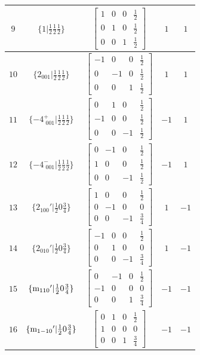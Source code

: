 \documentclass[fleqn,8pt]{jsarticle}
\begin{document}
\begin{longtable}{ccccc}
$ 9 $ & $ \{1|\frac{1}{2} \frac{1}{2} \frac{1}{2}\} $ & $ \begin{bmatrix} 1 & 0 & 0 & \frac{1}{2} \\ 0 & 1 & 0 & \frac{1}{2} \\ 0 & 0 & 1 & \frac{1}{2} \end{bmatrix} $ & $ 1 $ & $ 1 $ \\ \hline
$ 10 $ & $ \{2{}_{001}|\frac{1}{2} \frac{1}{2} \frac{1}{2}\} $ & $ \begin{bmatrix} -1 & 0 & 0 & \frac{1}{2} \\ 0 & -1 & 0 & \frac{1}{2} \\ 0 & 0 & 1 & \frac{1}{2} \end{bmatrix} $ & $ 1 $ & $ 1 $ \\ \hline
$ 11 $ & $ \{-4^{+}_{\,\,001}|\frac{1}{2} \frac{1}{2} \frac{1}{2}\} $ & $ \begin{bmatrix} 0 & 1 & 0 & \frac{1}{2} \\ -1 & 0 & 0 & \frac{1}{2} \\ 0 & 0 & -1 & \frac{1}{2} \end{bmatrix} $ & $ -1 $ & $ 1 $ \\ \hline
$ 12 $ & $ \{-4^{-}_{\,\,001}|\frac{1}{2} \frac{1}{2} \frac{1}{2}\} $ & $ \begin{bmatrix} 0 & -1 & 0 & \frac{1}{2} \\ 1 & 0 & 0 & \frac{1}{2} \\ 0 & 0 & -1 & \frac{1}{2} \end{bmatrix} $ & $ -1 $ & $ 1 $ \\ \hline
$ 13 $ & $ \{2{}_{100}{}'|\frac{1}{2} 0 \frac{3}{4}\} $ & $ \begin{bmatrix} 1 & 0 & 0 & \frac{1}{2} \\ 0 & -1 & 0 & 0 \\ 0 & 0 & -1 & \frac{3}{4} \end{bmatrix} $ & $ 1 $ & $ -1 $ \\ \hline
$ 14 $ & $ \{2{}_{010}{}'|\frac{1}{2} 0 \frac{3}{4}\} $ & $ \begin{bmatrix} -1 & 0 & 0 & \frac{1}{2} \\ 0 & 1 & 0 & 0 \\ 0 & 0 & -1 & \frac{3}{4} \end{bmatrix} $ & $ 1 $ & $ -1 $ \\ \hline
$ 15 $ & $ \{{\rm m}_{110}{}'|\frac{1}{2} 0 \frac{3}{4}\} $ & $ \begin{bmatrix} 0 & -1 & 0 & \frac{1}{2} \\ -1 & 0 & 0 & 0 \\ 0 & 0 & 1 & \frac{3}{4} \end{bmatrix} $ & $ -1 $ & $ -1 $ \\ \hline
$ 16 $ & $ \{{\rm m}_{1-10}{}'|\frac{1}{2} 0 \frac{3}{4}\} $ & $ \begin{bmatrix} 0 & 1 & 0 & \frac{1}{2} \\ 1 & 0 & 0 & 0 \\ 0 & 0 & 1 & \frac{3}{4} \end{bmatrix} $ & $ -1 $ & $ -1 $ \\
\end{longtable}
\end{document}
